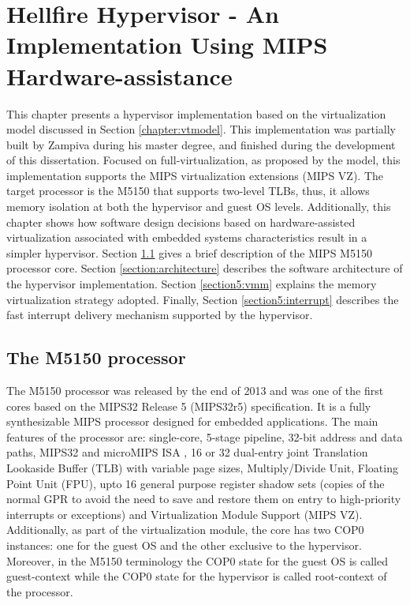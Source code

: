 \chapter{\label{chapter:implementation}Hellfire Hypervisor - An Implementation Using MIPS Hardware-assistance}

This chapter presents a hypervisor implementation based on the virtualization model discussed in Section \ref{chapter:vtmodel}. This implementation was partially built by Zampiva \cite{samir2013} during his master degree, and finished during the development of this dissertation. Focused on full-virtualization, as proposed by the model, this implementation supports the MIPS virtualization extensions (MIPS VZ). The target processor is the M5150 that supports two-level TLBs, thus, it allows memory isolation at both the hypervisor and guest OS levels. Additionally, this chapter shows how software design decisions based on hardware-assisted virtualization associated with embedded systems characteristics result in a simpler hypervisor. Section \ref{chapter5:m5150} gives a brief description of the MIPS M5150 processor core. Section \ref{section:architecture} describes the software architecture of the hypervisor implementation. Section \ref{section5:vmm} explains the memory virtualization strategy adopted. Finally, Section \ref{section5:interrupt} describes the fast interrupt delivery mechanism supported by the hypervisor. 

\section{The M5150 processor}
\label{chapter5:m5150}

The M5150 processor was released by the end of 2013 and was one of the first cores based on the MIPS32 Release 5 (MIPS32r5) specification. It is a fully synthesizable MIPS processor designed for embedded applications. The main features of the processor are: single-core, 5-stage pipeline, 32-bit address and data paths, MIPS32 and microMIPS ISA \cite{micromipsISA}, 16 or 32 dual-entry joint Translation Lookaside Buffer (TLB) with variable page sizes, Multiply/Divide Unit, Floating Point Unit (FPU), upto 16 general purpose register shadow sets (copies of the normal GPR to avoid the need to save and restore them on entry to high-priority interrupts or exceptions) and Virtualization Module Support (MIPS VZ). Additionally, as part of the virtualization module, the core has two COP0 instances: one for the guest OS and the other exclusive to the hypervisor. Moreover, in the M5150 terminology the COP0 state for the guest OS is called guest-context while the COP0 state for the hypervisor is called root-context of the processor.

